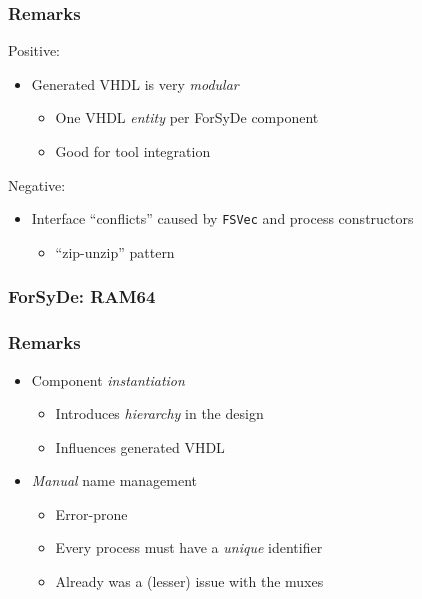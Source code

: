 \documentclass{beamer}
\begin{document}
            \begin{frame}
                \frametitle{Remarks}
                \par{Positive:}
                \begin{itemize}
                    \item Generated VHDL is very \emph{modular}
                        \begin{itemize}
                            \item One VHDL \emph{entity} per ForSyDe component
                            \item Good for tool integration
                        \end{itemize}
                \end{itemize}

                \par{Negative:}
                \begin{itemize}
                    \item Interface ``conflicts'' caused by \texttt{FSVec} and process constructors
                        \begin{itemize}
                            \item ``zip-unzip'' pattern
                        \end{itemize}
                \end{itemize}
            \end{frame}

            \begin{frame}
                \frametitle{ForSyDe: RAM64}
            \end{frame}

            \begin{frame}
                \frametitle{Remarks}

                \begin{itemize}
                    \item Component \emph{instantiation}
                        \begin{itemize}
                            \item Introduces \emph{hierarchy} in the design
                            \item Influences generated VHDL
                        \end{itemize}
                    \item \emph{Manual} name management
                        \begin{itemize}
                            \item Error-prone
                            \item Every process must have a \emph{unique} identifier
                            \item Already was a (lesser) issue with the muxes
                        \end{itemize}
                \end{itemize}
            \end{frame}
\end{document}
